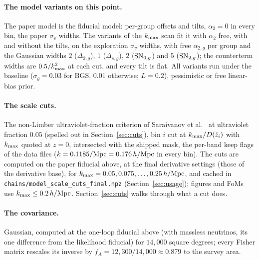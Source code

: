 \documentclass[11pt]{article}
\newcommand{\kmax}{k_{\rm max}}
\newcommand{\hMpc}{\,h/{\rm Mpc}}
\newcommand{\us}{\_\allowbreak}
\begin{document}
\paragraph{The model variants on this point.}
The paper model is the fiducial model: per-group offsets and tilts,
$\alpha_2 = 0$ in every bin, the paper
$\sigma_v$ widths.  The variants of the
$\kmax$ scan fit it with $\alpha_2$ free, with and without the
tilts, on the exploration $\sigma_v$ widths, with free
$\alpha_{2,g}$ per group and the Gaussian widths $2$ ($\Delta_{2,g}$),
$1$ ($\Delta_{s,g}$), $2$ (${\rm SN}_{0,g}$) and $5$
(${\rm SN}_{2,g}$); the counterterm widths are $0.5/\kmax^2$ at each
cut, and every tilt is flat.  All variants run under the baseline
($\sigma_g = 0.03$ for BGS, $0.01$ otherwise; $L = 0.2$), pessimistic
or free linear-bias prior.

\paragraph{The scale cuts.}
The non-Limber ultraviolet-fraction criterion of
Saraivanov et al.~\cite{Saraivanov2026} at ultraviolet fraction $0.05$
(spelled out in Section~\ref{sec:cuts}), bin $i$
cut at $\kmax/D(\bar{z}_i)$ with $\kmax$ quoted at $z = 0$,
intersected with the shipped mask, the per-band keep flags of the
data files ($k = 0.1185/{\rm Mpc} =
0.176\hMpc$ in every bin).  The cuts are computed on the paper
fiducial above, at the final derivative settings (those of the
derivative base), for
$\kmax = 0.05, 0.075, \ldots, 0.25\hMpc$, and cached in
\texttt{chains/model\us scale\us cuts\us final.npz}
(Section~\ref{sec:usage}); figures and FoMs use $\kmax \le 0.2\hMpc$.
Section~\ref{sec:cuts} walks through what a cut does.

\paragraph{The covariance.}
Gaussian, computed at the one-loop fiducial above (with massless
neutrinos, its one difference from the likelihood fiducial) for
$14{,}000$ square degrees; every Fisher matrix rescales its inverse by
$f_A = 12{,}300/14{,}000 \approx 0.879$ to the survey area.
\end{document}

